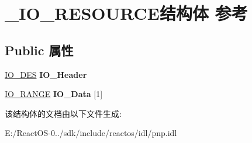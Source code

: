 \hypertarget{struct___i_o___r_e_s_o_u_r_c_e}{}\section{\+\_\+\+I\+O\+\_\+\+R\+E\+S\+O\+U\+R\+C\+E结构体 参考}
\label{struct___i_o___r_e_s_o_u_r_c_e}
\subsection*{Public 属性}
\begin{DoxyCompactItemize}
\item 
\mbox{\label{struct___i_o___r_e_s_o_u_r_c_e_a047168687722e5c73ac39282b3a8bf04}} 
\hyperlink{struct_i_o___des__s}{I\+O\+\_\+\+D\+ES} {\bfseries I\+O\+\_\+\+Header}
\item 
\mbox{\label{struct___i_o___r_e_s_o_u_r_c_e_abb7a6e12403ab601380d85d0ddf45bef}} 
\hyperlink{struct_i_o___range__s}{I\+O\+\_\+\+R\+A\+N\+GE} {\bfseries I\+O\+\_\+\+Data} \mbox{[}1\mbox{]}
\end{DoxyCompactItemize}


该结构体的文档由以下文件生成\+:\begin{DoxyCompactItemize}
\item 
E\+:/\+React\+O\+S-\/0../sdk/include/reactos/idl/pnp.\+idl\end{DoxyCompactItemize}

